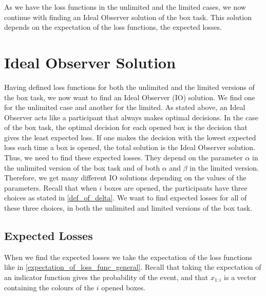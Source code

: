 As we have the loss functions in the unlimited and the limited cases, we now continue with finding an Ideal Observer solution of the box task. This solution depends on the expectation of the loss functions, the expected losses. 

\section{Ideal Observer Solution}
Having defined loss functions for both the unlimited and the limited versions of the box task, we now want to find an Ideal Observer (IO) solution. We find one for the unlimited case and another for the limited. As stated above, an Ideal Observer acts like a participant that always makes optimal decisions. In the case of the box task, the optimal decision for each opened box is the decision that gives the least expected loss. If one makes the decision with the lowest expected loss each time a box is opened, the total solution is the Ideal Observer solution. Thus, we need to find these expected losses. They depend on the parameter $\alpha$ in the unlimited version of the box task and of both $\alpha$ and $\beta$ in the limited version. Therefore, we get many different IO solutions depending on the values of the parameters. 
Recall that when $i$ boxes are opened, the participants have three choices as stated in \eqref{def_of_delta}. We want to find expected losses for all of these three choices, in both the unlimited and limited versions of the box task.  


 

\subsection{Expected Losses}
\label{section:exp_losses}
When we find the expected losses we take the expectation of the loss functions like in \eqref{expectation_of_loss_func_general}. Recall that taking the expectation of an indicator function gives the probability of the event, and that $x_{1:i}$ is a vector containing the colours of the $i$ opened boxes.

